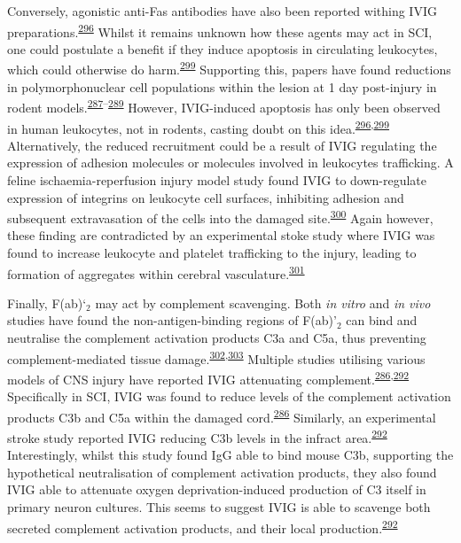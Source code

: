 \documentclass[
]{article}
\begin{document}
Conversely, agonistic anti-Fas antibodies have also been reported withing IVIG preparations.\textsuperscript{\protect\hyperlink{ref-altznauer_concurrent_2003}{296}}
Whilst it remains unknown how these agents may act in SCI, one could postulate a benefit if they induce apoptosis in circulating leukocytes, which could otherwise do harm.\textsuperscript{\protect\hyperlink{ref-schneider_ivig_2017}{299}}
Supporting this, papers have found reductions in polymorphonuclear cell populations within the lesion at 1 day post-injury in rodent models.\textsuperscript{\protect\hyperlink{ref-nguyen_immunoglobulin_2012}{287}--\protect\hyperlink{ref-gok_immunomodulation_2009}{289}}
However, IVIG-induced apoptosis has only been observed in human leukocytes, not in rodents, casting doubt on this idea.\textsuperscript{\protect\hyperlink{ref-altznauer_concurrent_2003}{296},\protect\hyperlink{ref-schneider_ivig_2017}{299}}
Alternatively, the reduced recruitment could be a result of IVIG regulating the expression of adhesion molecules or molecules involved in leukocytes trafficking.
A feline ischaemia-reperfusion injury model study found IVIG to down-regulate expression of integrins on leukocyte cell surfaces, inhibiting adhesion and subsequent extravasation of the cells into the damaged site.\textsuperscript{\protect\hyperlink{ref-gill_targeting_2005}{300}}
Again however, these finding are contradicted by an experimental stoke study where IVIG was found to increase leukocyte and platelet trafficking to the injury, leading to formation of aggregates within cerebral vasculature.\textsuperscript{\protect\hyperlink{ref-lapointe_ivig_2004}{301}}

Finally, F(ab)`\(_2\) may act by complement scavenging.
Both \emph{in vitro} and \emph{in vivo} studies have found the non-antigen-binding regions of F(ab)'\(_2\) can bind and neutralise the complement activation products C3a and C5a, thus preventing complement-mediated tissue damage.\textsuperscript{\protect\hyperlink{ref-basta_fab2-mediated_2003}{302},\protect\hyperlink{ref-basta_mechanism_1989}{303}}
Multiple studies utilising various models of CNS injury have reported IVIG attenuating complement.\textsuperscript{\protect\hyperlink{ref-brennan_ivig_2016}{286},\protect\hyperlink{ref-arumugam_intravenous_2007}{292}}
Specifically in SCI, IVIG was found to reduce levels of the complement activation products C3b and C5a within the damaged cord.\textsuperscript{\protect\hyperlink{ref-brennan_ivig_2016}{286}}
Similarly, an experimental stroke study reported IVIG reducing C3b levels in the infract area.\textsuperscript{\protect\hyperlink{ref-arumugam_intravenous_2007}{292}}
Interestingly, whilst this study found IgG able to bind mouse C3b, supporting the hypothetical neutralisation of complement activation products, they also found IVIG able to attenuate oxygen deprivation-induced production of C3 itself in primary neuron cultures.
This seems to suggest IVIG is able to scavenge both secreted complement activation products, and their local production.\textsuperscript{\protect\hyperlink{ref-arumugam_intravenous_2007}{292}}
\end{document}
